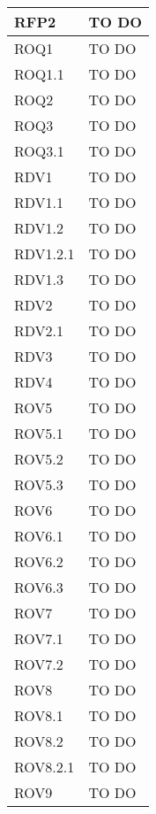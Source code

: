 \begin{center}
\begin{longtable}{| p{4cm} | p{8cm} |}
\hline
RFP2   &  TO DO \\
\hline
ROQ1   &  TO DO \\
\hline
ROQ1.1   &  TO DO \\
\hline
ROQ2   &  TO DO \\
\hline
ROQ3   &  TO DO \\
\hline
ROQ3.1   &  TO DO \\
\hline
RDV1   &  TO DO \\
\hline
RDV1.1   &  TO DO \\
\hline
RDV1.2   &  TO DO \\
\hline
RDV1.2.1   &  TO DO \\
\hline
RDV1.3   &  TO DO \\
\hline
RDV2   &  TO DO \\
\hline
RDV2.1   &  TO DO \\
\hline
RDV3   &  TO DO \\
\hline
RDV4   &  TO DO \\
\hline
ROV5   &  TO DO \\
\hline
ROV5.1   &  TO DO \\
\hline
ROV5.2   &  TO DO \\
\hline
ROV5.3   &  TO DO \\
\hline
ROV6   &  TO DO \\
\hline
ROV6.1   &  TO DO \\
\hline
ROV6.2   &  TO DO \\
\hline
ROV6.3   &  TO DO \\
\hline
ROV7   &  TO DO \\
\hline
ROV7.1   &  TO DO \\
\hline
ROV7.2   &  TO DO \\
\hline
ROV8   &  TO DO \\
\hline
ROV8.1   &  TO DO \\
\hline
ROV8.2   &  TO DO \\
\hline
ROV8.2.1   &  TO DO \\
\hline
ROV9   &  TO DO \\
\hline
\end{longtable}
\egroup
\end{center}
